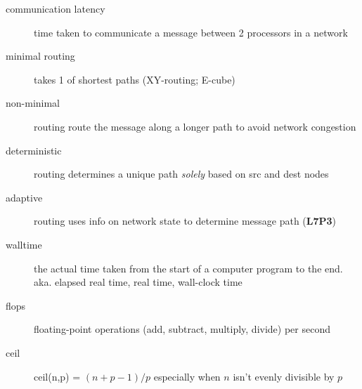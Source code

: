 \begin{description}
\item[communication latency] time taken to communicate a message between 2 processors in a network
\item[minimal routing] takes 1 of shortest paths (XY-routing; E-cube)
\item[non-minimal] routing route the message along a longer path to avoid network congestion
\item[deterministic] routing determines a unique path \emph{solely} based on src and dest nodes
\item[adaptive] routing uses info on network state to determine message path (\textbf{L7P3})
\item[walltime] the actual time taken from the start of a computer program to the end. aka. elapsed real time, real time, wall-clock time
\item[flops] floating-point operations (add, subtract, multiply, divide) per second
\item[ceil] ceil(n,p) = $(n + p - 1) / p$ especially when $n$ isn't evenly divisible by $p$


\end{description}
